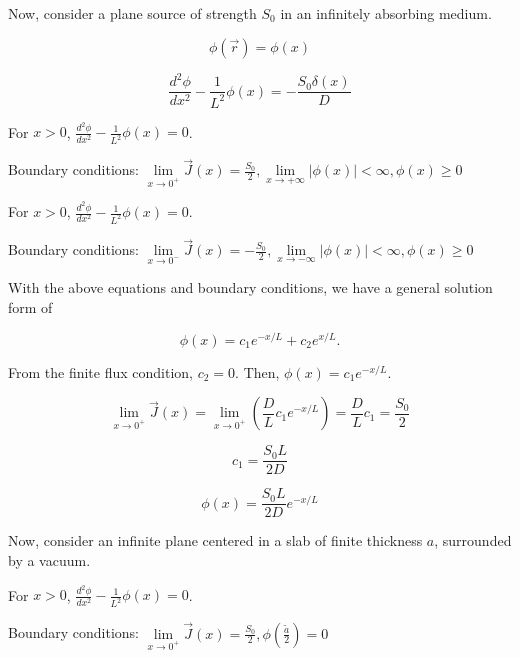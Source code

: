 \documentclass[12pt]{article}
\newcommand{\rvec}{\ensuremath{\vec{r}}}
\begin{document}
Now, consider a plane source of strength $S_0$ in an infinitely absorbing medium.

\begin{equation*}
\phi(\rvec) = \phi(x)
\end{equation*}

\begin{equation*}
\frac{d^2\phi}{dx^2} - \frac{1}{L^2}\phi(x) = -\frac{S_0\delta(x)}{D}
\end{equation*}

For $x > 0$, $\frac{d^2\phi}{dx^2} - \frac{1}{L^2}\phi(x) = 0$.


Boundary conditions: 
$\lim\limits_{x\rightarrow 0^+}\vec{J}(x) = \frac{S_0}{2}, \lim\limits_{x\rightarrow +\infty}|\phi(x)|<\infty, \phi(x) \geq 0$

For $x > 0$, $\frac{d^2\phi}{dx^2} - \frac{1}{L^2}\phi(x) = 0$.


Boundary conditions: 
$\lim\limits_{x\rightarrow 0^-}\vec{J}(x) = -\frac{S_0}{2}, \lim\limits_{x\rightarrow -\infty}|\phi(x)|<\infty, \phi(x) \geq 0$

With the above equations and boundary conditions, we have a general solution form of

\begin{equation*}
\phi(x) = c_1e^{-x/L} + c_2e^{x/L}.
\end{equation*}

From the finite flux condition, $c_2 = 0$. Then, $\phi(x) = c_1e^{-x/L}$.

\begin{equation*}
\lim\limits_{x\to 0^+} \vec{J}(x) = \lim\limits_{x\to 0^+}\left(\frac{D}{L}c_1e^{-x/L}\right) = 
\frac{D}{L}c_1 = \frac{S_0}{2}
\end{equation*}

\begin{equation*}
c_1 = \frac{S_0 L}{2D}
\end{equation*}

\begin{equation*}
\phi(x) = \frac{S_0L}{2D}e^{-x/L}
\end{equation*}

Now, consider an infinite plane centered in a slab of finite thickness $a$, surrounded by a vacuum.


For $x > 0$, $\frac{d^2\phi}{dx^2} - \frac{1}{L^2}\phi(x) = 0$.


Boundary conditions: 
$\lim\limits_{x\rightarrow 0^+}\vec{J}(x) = \frac{S_0}{2}, \phi(\tfrac{\tilde{a}}{2}) = 0$
\end{document}
